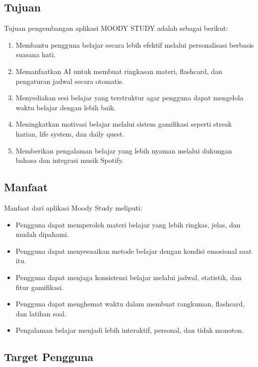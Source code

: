 \documentclass[11pt]{article}
\begin{document}
\subsection{Tujuan}

Tujuan pengembangan aplikasi MOODY STUDY adalah sebagai berikut:

\begin{enumerate}[label=\arabic*.]
    \item Membantu pengguna belajar secara lebih efektif melalui personalisasi berbasis suasana hati.
    \item Memanfaatkan AI untuk membuat ringkasan materi, flashcard, dan pengaturan jadwal secara otomatis.
    \item Menyediakan sesi belajar yang terstruktur agar pengguna dapat mengelola waktu belajar dengan lebih baik.
    \item Meningkatkan motivasi belajar melalui sistem gamifikasi seperti streak harian, life system, dan daily quest.
    \item Memberikan pengalaman belajar yang lebih nyaman melalui dukungan bahasa dan integrasi musik Spotify.
\end{enumerate}

\subsection{Manfaat}

Manfaat dari aplikasi Moody Study meliputi:

\begin{itemize}
    \item Pengguna dapat memperoleh materi belajar yang lebih ringkas, jelas, dan mudah dipahami.
    \item Pengguna dapat menyesuaikan metode belajar dengan kondisi emosional saat itu.
    \item Pengguna dapat menjaga konsistensi belajar melalui jadwal, statistik, dan fitur gamifikasi.
    \item Pengguna dapat menghemat waktu dalam membuat rangkuman, flashcard, dan latihan soal.
    \item Pengalaman belajar menjadi lebih interaktif, personal, dan tidak monoton.
\end{itemize}

\subsection{Target Pengguna}
\end{document}
